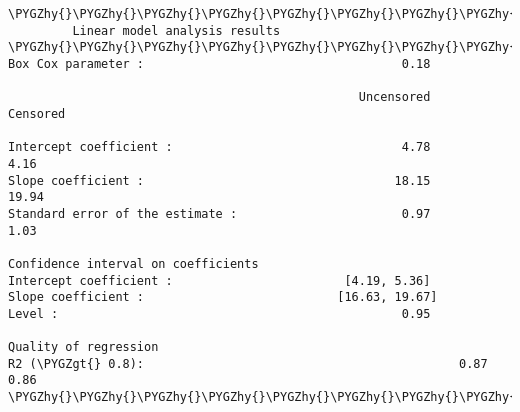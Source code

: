 \documentclass[letterpaper,10pt,english]{sphinxmanual}
\def\PYGZgt{\char`\>}
\def\PYGZhy{\char`\-}
\begin{document}
\begin{Verbatim}[commandchars=\\\{\}]
\PYGZhy{}\PYGZhy{}\PYGZhy{}\PYGZhy{}\PYGZhy{}\PYGZhy{}\PYGZhy{}\PYGZhy{}\PYGZhy{}\PYGZhy{}\PYGZhy{}\PYGZhy{}\PYGZhy{}\PYGZhy{}\PYGZhy{}\PYGZhy{}\PYGZhy{}\PYGZhy{}\PYGZhy{}\PYGZhy{}\PYGZhy{}\PYGZhy{}\PYGZhy{}\PYGZhy{}\PYGZhy{}\PYGZhy{}\PYGZhy{}\PYGZhy{}\PYGZhy{}\PYGZhy{}\PYGZhy{}\PYGZhy{}\PYGZhy{}\PYGZhy{}\PYGZhy{}\PYGZhy{}\PYGZhy{}\PYGZhy{}\PYGZhy{}\PYGZhy{}\PYGZhy{}\PYGZhy{}\PYGZhy{}\PYGZhy{}\PYGZhy{}\PYGZhy{}\PYGZhy{}\PYGZhy{}\PYGZhy{}\PYGZhy{}\PYGZhy{}\PYGZhy{}\PYGZhy{}\PYGZhy{}\PYGZhy{}\PYGZhy{}\PYGZhy{}\PYGZhy{}\PYGZhy{}\PYGZhy{}\PYGZhy{}\PYGZhy{}\PYGZhy{}\PYGZhy{}\PYGZhy{}\PYGZhy{}\PYGZhy{}\PYGZhy{}\PYGZhy{}\PYGZhy{}\PYGZhy{}\PYGZhy{}\PYGZhy{}\PYGZhy{}\PYGZhy{}\PYGZhy{}\PYGZhy{}\PYGZhy{}\PYGZhy{}\PYGZhy{}
         Linear model analysis results
\PYGZhy{}\PYGZhy{}\PYGZhy{}\PYGZhy{}\PYGZhy{}\PYGZhy{}\PYGZhy{}\PYGZhy{}\PYGZhy{}\PYGZhy{}\PYGZhy{}\PYGZhy{}\PYGZhy{}\PYGZhy{}\PYGZhy{}\PYGZhy{}\PYGZhy{}\PYGZhy{}\PYGZhy{}\PYGZhy{}\PYGZhy{}\PYGZhy{}\PYGZhy{}\PYGZhy{}\PYGZhy{}\PYGZhy{}\PYGZhy{}\PYGZhy{}\PYGZhy{}\PYGZhy{}\PYGZhy{}\PYGZhy{}\PYGZhy{}\PYGZhy{}\PYGZhy{}\PYGZhy{}\PYGZhy{}\PYGZhy{}\PYGZhy{}\PYGZhy{}\PYGZhy{}\PYGZhy{}\PYGZhy{}\PYGZhy{}\PYGZhy{}\PYGZhy{}\PYGZhy{}\PYGZhy{}\PYGZhy{}\PYGZhy{}\PYGZhy{}\PYGZhy{}\PYGZhy{}\PYGZhy{}\PYGZhy{}\PYGZhy{}\PYGZhy{}\PYGZhy{}\PYGZhy{}\PYGZhy{}\PYGZhy{}\PYGZhy{}\PYGZhy{}\PYGZhy{}\PYGZhy{}\PYGZhy{}\PYGZhy{}\PYGZhy{}\PYGZhy{}\PYGZhy{}\PYGZhy{}\PYGZhy{}\PYGZhy{}\PYGZhy{}\PYGZhy{}\PYGZhy{}\PYGZhy{}\PYGZhy{}\PYGZhy{}\PYGZhy{}
Box Cox parameter :                                    0.18

                                                 Uncensored      Censored

Intercept coefficient :                                4.78          4.16
Slope coefficient :                                   18.15         19.94
Standard error of the estimate :                       0.97          1.03

Confidence interval on coefficients
Intercept coefficient :                        [4.19, 5.36]
Slope coefficient :                           [16.63, 19.67]
Level :                                                0.95

Quality of regression
R2 (\PYGZgt{} 0.8):                                            0.87          0.86
\PYGZhy{}\PYGZhy{}\PYGZhy{}\PYGZhy{}\PYGZhy{}\PYGZhy{}\PYGZhy{}\PYGZhy{}\PYGZhy{}\PYGZhy{}\PYGZhy{}\PYGZhy{}\PYGZhy{}\PYGZhy{}\PYGZhy{}\PYGZhy{}\PYGZhy{}\PYGZhy{}\PYGZhy{}\PYGZhy{}\PYGZhy{}\PYGZhy{}\PYGZhy{}\PYGZhy{}\PYGZhy{}\PYGZhy{}\PYGZhy{}\PYGZhy{}\PYGZhy{}\PYGZhy{}\PYGZhy{}\PYGZhy{}\PYGZhy{}\PYGZhy{}\PYGZhy{}\PYGZhy{}\PYGZhy{}\PYGZhy{}\PYGZhy{}\PYGZhy{}\PYGZhy{}\PYGZhy{}\PYGZhy{}\PYGZhy{}\PYGZhy{}\PYGZhy{}\PYGZhy{}\PYGZhy{}\PYGZhy{}\PYGZhy{}\PYGZhy{}\PYGZhy{}\PYGZhy{}\PYGZhy{}\PYGZhy{}\PYGZhy{}\PYGZhy{}\PYGZhy{}\PYGZhy{}\PYGZhy{}\PYGZhy{}\PYGZhy{}\PYGZhy{}\PYGZhy{}\PYGZhy{}\PYGZhy{}\PYGZhy{}\PYGZhy{}\PYGZhy{}\PYGZhy{}\PYGZhy{}\PYGZhy{}\PYGZhy{}\PYGZhy{}\PYGZhy{}\PYGZhy{}\PYGZhy{}\PYGZhy{}\PYGZhy{}\PYGZhy{}


\end{Verbatim}
\end{document}
